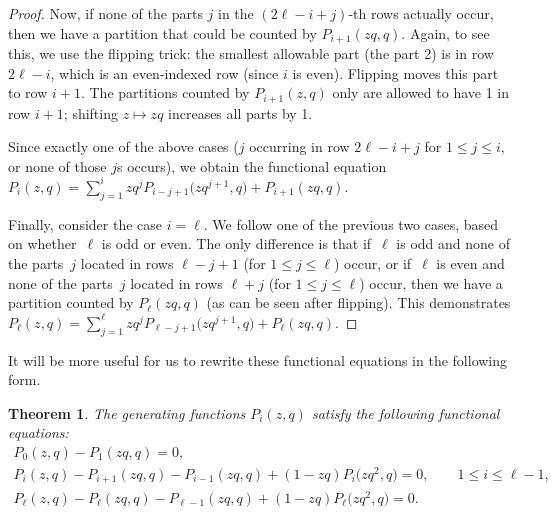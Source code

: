 \documentclass[10pt,a4paper]{amsart}
\numberwithin{equation}{section}
\newtheorem{Theorem}{Theorem}[section]
\theoremstyle{definition}
\begin{document}
\begin{proof}
Now, if none of the parts $j$ in the $(2\ell-i+j)$-th rows actually occur, then we have a partition that could be counted by $P_{i+1}(zq,q)$. Again, to see this, we use the flipping trick: the smallest allowable part (the part 2) is in row $2\ell-i$, which is an even-indexed row (since $i$ is even). Flipping moves this part to row $i+1$. The partitions counted by $P_{i+1}(z,q)$ only are allowed to have 1 in row $i+1$; shifting $z\mapsto zq$ increases all parts by 1.

Since exactly one of the above cases ($j$ occurring in row $2\ell-i+j$ for $1 \le j \le i$, or none of those $j$s occurs), we obtain the functional equation $P_i(z,q) = \sum_{j=1}^i zq^j P_{i-j+1}\bigl(zq^{j+1},q\bigr)+ P_{i+1}(zq,q)$.

Finally, consider the case $i=\ell$. We follow one of the previous two cases, based on whether~$\ell$ is odd or even. The only difference is that if~$\ell$ is odd and none of the parts~$j$ located in rows $\ell-j+1$ (for $1\le j \le \ell$) occur, or if~$\ell$ is even and none of the parts~$j$ located in rows $\ell+j$ (for $1\le j \le \ell$) occur, then we have a partition counted by $P_{\ell}(zq,q)$ (as can be seen after flipping). This demonstrates $P_\ell(z,q) = \sum_{j=1}^\ell zq^j P_{\ell-j+1}\bigl(zq^{j+1},q\bigr) + P_\ell(zq,q)$.
\end{proof}

It will be more useful for us to rewrite these functional equations in the following form.
\begin{Theorem} \label{thm:streamlinedPeqs}
The generating functions $P_i(z,q)$ satisfy the following functional equations:
\begin{gather}P_0(z,q)-P_1(zq,q) =0,
\label{eq:newPrec1} \\
P_i(z,q) - P_{i+1}(zq,q) - P_{i-1}(zq,q) + (1-zq)P_{i}\bigl(zq^2,q\bigr) =0, \qquad 1 \le i \le \ell-1, \label{eq:newPrec2} \\
P_\ell(z,q) - P_\ell(zq,q) -P_{\ell-1}(zq,q) + (1-zq) P_{\ell}\bigl(zq^2,q\bigr) = 0. \label{eq:newPrec3}
\end{gather}
\end{Theorem}
\end{document}

